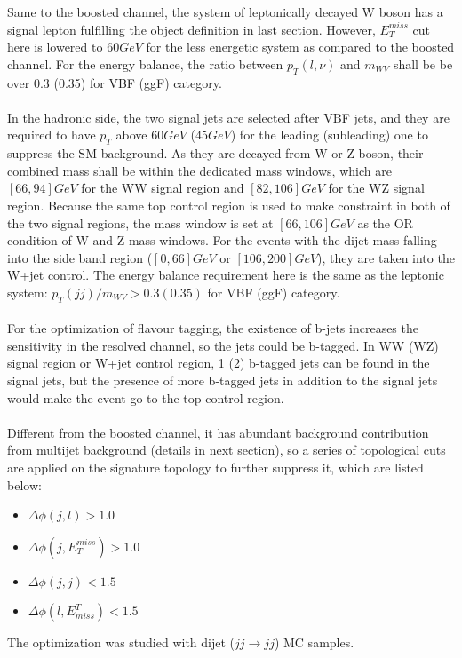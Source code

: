 Same to the boosted channel, the system of leptonically decayed W boson has a signal lepton fulfilling the object definition in last section. However, $E_{T}^{miss}$ cut here is lowered to $60GeV$ for the less energetic system as compared to the boosted channel. For the energy balance, the ratio between $p_{T}(l,\nu)$ and $m_{WV}$ shall be be over 0.3 (0.35) for VBF (ggF) category. 
\\
\\In the hadronic side, the two signal jets are selected after VBF jets, and they are required to have $p_{T}$ above $60GeV$ ($45GeV$) for the leading (subleading) one to suppress the SM background. As they are decayed from W or Z boson, their combined mass shall be within the dedicated mass windows, which are $[66, 94]GeV$ for the WW signal region and $[82, 106]GeV$ for the WZ signal region. Because the same top control region is used to make constraint in both of the two signal regions, the mass window is set at $[66,106]GeV$ as the OR condition of W and Z mass windows. For the events with the dijet mass falling into the side band region ($[0,66]GeV$ or $[106,200]GeV$), they are taken into the W+jet control. The energy balance requirement here is the same as the leptonic system: $p_{T}(jj)/m_{WV}>0.3(0.35)$ for VBF (ggF) category. 
\\
\\For the optimization of flavour tagging, the existence of b-jets increases the sensitivity in the resolved channel, so the jets could be b-tagged. In WW (WZ) signal region or W+jet control region, 1 (2) b-tagged jets can be found in the signal jets, but the presence of more b-tagged jets in addition to the signal jets would make the event go to the top control region.
\\
\\Different from the boosted channel, it has abundant background contribution from multijet background (details in next section), so a series of topological cuts are applied on the signature topology to further suppress it, which are listed below:
\begin{itemize}
	\item $\Delta\phi(j,l)>1.0$
	\item $\Delta\phi(j,E^{miss}_{T})>1.0$
	\item $\Delta\phi(j,j)<1.5$
	\item $\Delta\phi(l,E^{T}_{miss})<1.5$
\end{itemize}
The optimization was studied with dijet ($jj\rightarrow jj$) MC samples. 
\\
